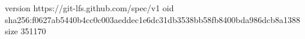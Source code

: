 version https://git-lfs.github.com/spec/v1
oid sha256:f0627ab5440b4cc0c003aeddec1e6dc31db3538bb58fb8400bda986dcb8a1388
size 351170
